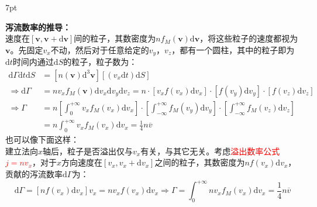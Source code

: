 \documentclass[zihao=-4,UTF8]{report}
\newenvironment{graybox}{%
\def\FrameCommand{%
\hspace{1pt}%
{\color{gray}\small \vrule width 2pt}%
{\color{graybox_color}\vrule width 4pt}%
\colorbox{graybox_color}%
}%
\MakeFramed{\advance\hsize-\width\FrameRestore}%
\noindent\hspace{-4.55pt}%
\begin{adjustwidth}{}{7pt}%
\vspace{2pt}\vspace{2pt}%
}
{%
\vspace{2pt}\end{adjustwidth}\endMakeFramed%
}
\begin{document}
\begin{graybox}
    \textbf{泻流数率的推导：}\\
    速度在$[\boldsymbol{v},\boldsymbol{v}+\mathrm{d}\boldsymbol{v}]$间的粒子，其数密度为$ nf_M(\boldsymbol{v})\mathrm{d}\boldsymbol{v}$，将这些粒子的速度都视为$\boldsymbol{v}$。先固定$v_x$不动，然后对于任意给定的$v_y$，$v_z$，都有一个圆柱，其中的粒子即为$\mathrm{d}t$时间内通过$\mathrm{d}S$的粒子，粒子数为：
    \begin{align*}
        \mathrm{d}\Gamma\mathrm{d}t \mathrm{d}S&= \left[n(\boldsymbol{v})\mathrm{d}^3\boldsymbol{v}\right]\left[(v_x\mathrm{d}t)\mathrm{d}S\right]\\
        \Longrightarrow  \mathrm{d}\Gamma &= n v_xf_M(\boldsymbol{v})\mathrm{d}v_x\mathrm{d}v_y\mathrm{d}v_z = n\cdot[v_xf(v_x)\mathrm{d}v_x]\cdot[f(v_y)\mathrm{d}v_y]\cdot[f(v_z)\mathrm{d}v_z]\\
        \Longrightarrow \Gamma 
        &= n \left[\int_{0}^{+\infty}v_xf_M(v_x)\mathrm{d}v_x \right] \cdot \left[\int_{-\infty}^{+\infty}  f_M(v_y)\mathrm{d}v_y\right]\cdot \left[\int_{-\infty}^{+\infty} f_M(v_z)\mathrm{d}v_z\right]\\
        & = n \int_{0}^{+\infty}v_xf_M(v_x)\mathrm{d}v_x = \frac{1}{4}n  \overline{v}
    \end{align*}
也可以像下面这样：\\
建立法向$x$轴后，粒子是否溢出仅与$v_x$有关，与其它无关。考虑\textcolor{red}{溢出数率公式$j = nv_x$}，对于$x$方向速度在$[v_x, v_x + \mathrm{d}v_x]$之间的粒子，其数密度为$nf(v_x)\mathrm{d}v_x$，贡献的泻流数率$ \mathrm{d}\Gamma $为：
\begin{equation}
    \mathrm{d}\Gamma = [nf(v_x)\mathrm{d}v_x]v_x = n v_xf(v_x)\mathrm{d}v_x \Longrightarrow \Gamma = \int_{0}^{+\infty} n v_xf_M(v_x)\mathrm{d}v_x = \frac{1}{4}n  \overline{v} 
\end{equation}
\end{graybox}
\end{document}
